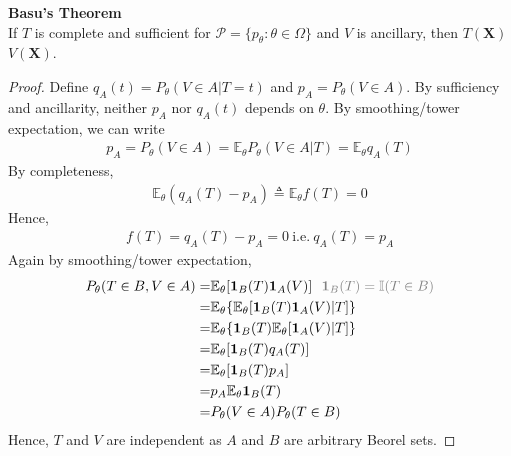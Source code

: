 \begin{theorem}
    \textbf{Basu's Theorem}\\
    If $T$ is complete and sufficient for $\mathcal{P}=\{p_\theta:\theta\in\Omega\}$
    and $V$ is ancillary, then $T(\boldsymbol{X})$  $V(\boldsymbol{X})$.
\end{theorem}
\begin{proof}
    Define $q_A(t)=P_\theta(V\in A|T=t)$ and $p_A=P_\theta(V\in A)$.
    By sufficiency and ancillarity, neither $p_A$ nor $q_A(t)$ depends on $\theta$.
    By smoothing/tower expectation, 
    we can write
    \begin{gather}
        p_A=P_\theta(V\in A)=\mathbb{E}_\theta P_\theta(V\in A|T)=\mathbb{E}_\theta q_A(T)
    \end{gather}
    By completeness,
    \begin{gather}
        \mathbb{E}_\theta(q_A(T)-p_A)\triangleq\mathbb{E}_\theta{f(T)}=0
    \end{gather}
    Hence, 
    \begin{gather}
        f(T)=q_A(T)-p_A=0~\text{i.e.}~q_A(T)=p_A
    \end{gather}
    Again by smoothing/tower expectation,
    \begin{align}
        P_\theta(T\in B,V\in A)
        =& \mathbb{E}_\theta[\mathbf{1}_B(T)\mathbf{1}_A(V)]~~{\color{gray} \mathbf{1}_B(T)=\mathbb{I}(T\in B)}\\
        =& \mathbb{E}_\theta\{\mathbb{E}_\theta[\mathbf{1}_B(T)\mathbf{1}_A(V)|T]\}\\
        =& \mathbb{E}_\theta\{\mathbf{1}_B(T)\mathbb{E}_\theta[\mathbf{1}_A(V)|T]\}\\
        =& \mathbb{E}_\theta[\mathbf{1}_B(T)q_A(T)]\\
        =& \mathbb{E}_\theta[\mathbf{1}_B(T)p_A]\\
        =& p_A\mathbb{E}_\theta\mathbf{1}_B(T)\\
        =& P_\theta(V\in A)P_\theta(T\in B)
    \end{align}
    Hence, $T$ and $V$ are independent as $A$ and $B$ are arbitrary Beorel sets.
\end{proof}

